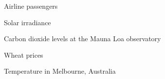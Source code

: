 
\begin{figure}
  \caption[Airline passengers]{Airline passengers}
\end{figure}


\begin{figure}
  \caption[Solar irradiance]{Solar irradiance}
\end{figure}


\begin{figure}
  \caption[Carbon dioxide levels at the Mauna Loa observatory]{Carbon dioxide levels at the Mauna Loa observatory}
\end{figure}


\begin{figure}
  \caption[Wheat prices]{Wheat prices}
\end{figure}


\begin{figure}
  \caption[Temperature in Melbourne, Australia]{Temperature in Melbourne, Australia}
\end{figure}


